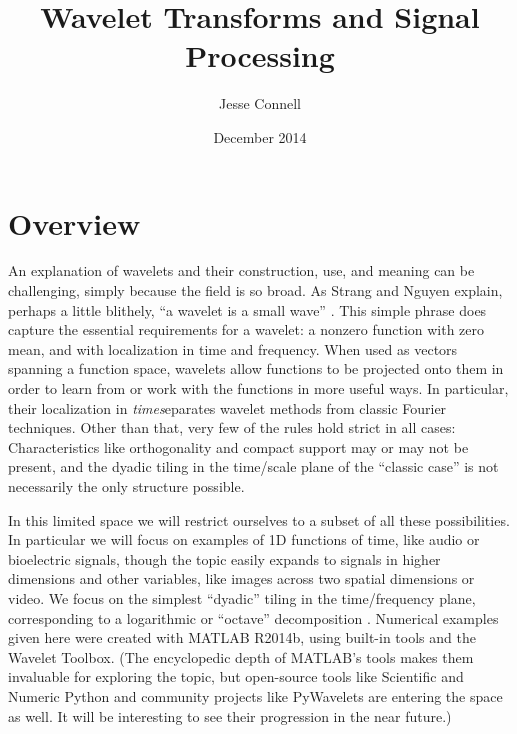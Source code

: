 \documentclass[letterpaper]{article}
\begin{document}
\title{Wavelet Transforms and Signal Processing}
\author{Jesse Connell}
\date{December 2014}
\maketitle


\section{Overview}

An explanation of wavelets and their construction, use, and meaning can be challenging, simply because the field is so broad.
As Strang and Nguyen explain, perhaps a little blithely, ``a wavelet is a small wave'' \cite[p.~26]{strang}.
This simple phrase does capture the essential requirements for a wavelet:
a nonzero function with zero mean, and with localization in time and frequency. 
When used as vectors spanning a function space, wavelets allow functions to be projected onto them in order to learn from or work with the functions in more useful ways.
In particular, their localization in \emph{time}\emph separates wavelet methods from classic Fourier techniques.
Other than that, very few of the rules hold strict in all cases:
Characteristics like orthogonality and compact support may or may not be present,
and the dyadic tiling in the time/scale plane of the ``classic case'' is not necessarily the only structure possible.

In this limited space we will restrict ourselves to a subset of all these possibilities.
In particular we will focus on examples of 1D functions of time, like audio or bioelectric signals,
though the topic easily expands to signals in higher dimensions and other variables, like images across two spatial dimensions or video.
We focus on the simplest ``dyadic'' tiling in the time/frequency plane, corresponding to a logarithmic or ``octave'' decomposition \cite{strang}.
Numerical examples given here were created with MATLAB R2014b, using built-in tools and the Wavelet Toolbox.
(The encyclopedic depth of MATLAB's tools makes them invaluable for exploring the topic,
but open-source tools like Scientific and Numeric Python and community projects like PyWavelets \cite{pywavelets} are entering the space as well.
It will be interesting to see their progression in the near future.)
\end{document}
